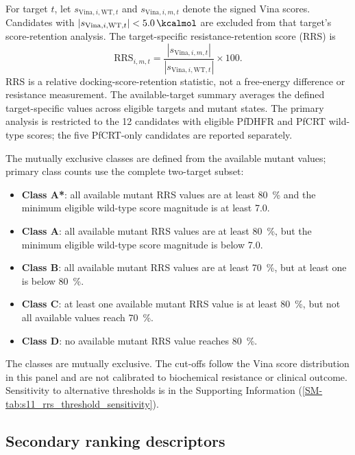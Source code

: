 \documentclass[11pt,a4paper]{article}
\begin{document}
For target $t$, let $s_{\mathrm{Vina},i,\mathrm{WT},t}$ and $s_{\mathrm{Vina},i,m,t}$ denote the signed Vina scores. Candidates with $|s_{\mathrm{Vina},i,\mathrm{WT},t}| < \qty{5.0}{\kcalmol}$ are excluded from that target's score-retention analysis. The target-specific resistance-retention score (RRS) is
\begin{equation}
\mathrm{RRS}_{i,m,t} = \frac{|s_{\mathrm{Vina},i,m,t}|}{|s_{\mathrm{Vina},i,\mathrm{WT},t}|} \times 100.
\end{equation}
RRS is a relative docking-score-retention statistic, not a free-energy difference or resistance measurement. The available-target summary averages the defined target-specific values across eligible targets and mutant states. The primary analysis is restricted to the 12 candidates with eligible PfDHFR and PfCRT wild-type scores; the five PfCRT-only candidates are reported separately.

The mutually exclusive classes are defined from the available mutant values; primary class counts use the complete two-target subset:
\begin{itemize}
    \item \textbf{Class A*}: all available mutant RRS values are at least \qty{80}{\percent} and the minimum eligible wild-type score magnitude is at least \qty{7.0}{\kcalmol}.
    \item \textbf{Class A}: all available mutant RRS values are at least \qty{80}{\percent}, but the minimum eligible wild-type score magnitude is below \qty{7.0}{\kcalmol}.
    \item \textbf{Class B}: all available mutant RRS values are at least \qty{70}{\percent}, but at least one is below \qty{80}{\percent}.
    \item \textbf{Class C}: at least one available mutant RRS value is at least \qty{80}{\percent}, but not all available values reach \qty{70}{\percent}.
    \item \textbf{Class D}: no available mutant RRS value reaches \qty{80}{\percent}.
\end{itemize}
The classes are mutually exclusive. The cut-offs follow the Vina score distribution in this panel and are not calibrated to biochemical resistance or clinical outcome. Sensitivity to alternative thresholds is in the Supporting Information (\cref{SM-tab:s11_rrs_threshold_sensitivity}).

\subsection{Secondary ranking descriptors}
\end{document}
